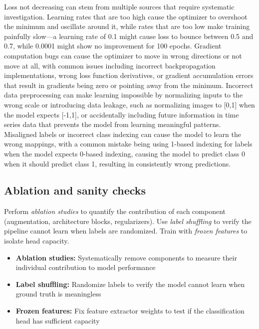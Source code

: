 Loss not decreasing can stem from multiple sources that require systematic investigation. Learning rates that are too high cause the optimizer to overshoot the minimum and oscillate around it, while rates that are too low make training painfully slow—a learning rate of 0.1 might cause loss to bounce between 0.5 and 0.7, while 0.0001 might show no improvement for 100 epochs. Gradient computation bugs can cause the optimizer to move in wrong directions or not move at all, with common issues including incorrect backpropagation implementations, wrong loss function derivatives, or gradient accumulation errors that result in gradients being zero or pointing away from the minimum. Incorrect data preprocessing can make learning impossible by normalizing inputs to the wrong scale or introducing data leakage, such as normalizing images to [0,1] when the model expects [-1,1], or accidentally including future information in time series data that prevents the model from learning meaningful patterns. Misaligned labels or incorrect class indexing can cause the model to learn the wrong mappings, with a common mistake being using 1-based indexing for labels when the model expects 0-based indexing, causing the model to predict class 0 when it should predict class 1, resulting in consistently wrong predictions.


\subsection{Ablation and sanity checks}

Perform \emph{ablation studies}  to quantify the contribution of each component (augmentation, architecture blocks, regularizers). Use \emph{label shuffling} to verify the pipeline cannot learn when labels are randomized. Train with \emph{frozen features} to isolate head capacity.

\begin{remark}
\begin{itemize}
    \item \textbf{Ablation studies:} Systematically remove components to measure their individual contribution to model performance
    \item \textbf{Label shuffling:} Randomize labels to verify the model cannot learn when ground truth is meaningless
    \item \textbf{Frozen features:} Fix feature extractor weights to test if the classification head has sufficient capacity
\end{itemize}
\end{remark}

